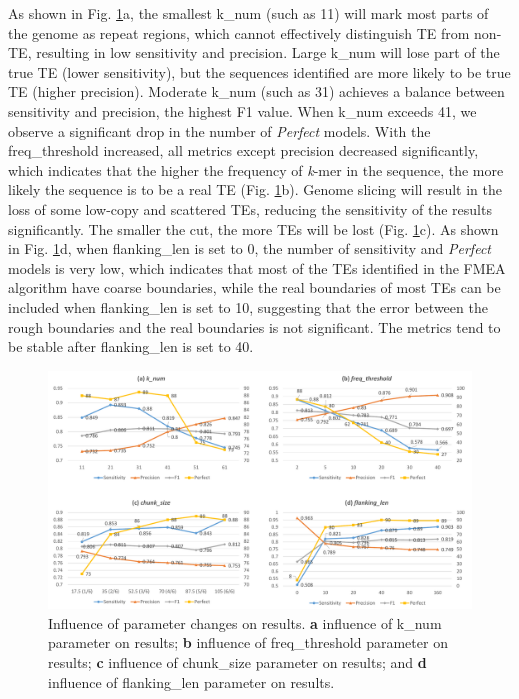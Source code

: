 \documentclass{bmcart}
\begin{document}
As shown in Fig. \ref{fig:param_results}a, the smallest k\_num (such as 11) will mark most parts of the genome as repeat regions, which cannot effectively distinguish TE from non-TE, resulting in low sensitivity and precision. Large k\_num will lose part of the true TE (lower sensitivity), but the sequences identified are more likely to be true TE (higher precision). Moderate k\_num (such as 31) achieves a balance between sensitivity and precision, the highest F1 value. When k\_num exceeds 41, we observe a significant drop in the number of \emph{Perfect} models. 
With the freq\_threshold increased, all metrics except precision decreased significantly, which indicates that the higher the frequency of \emph{k}-mer in the sequence, the more likely the sequence is to be a real TE (Fig. \ref{fig:param_results}b).
Genome slicing will result in the loss of some low-copy and scattered TEs, reducing the sensitivity of the results significantly. The smaller the cut, the more TEs will be lost (Fig. \ref{fig:param_results}c).
As shown in Fig. \ref{fig:param_results}d, when flanking\_len is set to 0, the number of sensitivity and \emph{Perfect} models is very low, which indicates that most of the TEs identified in the FMEA algorithm have coarse boundaries, while the real boundaries of most TEs can be included when flanking\_len is set to 10, suggesting that the error between the rough boundaries and the real boundaries is not significant. The metrics tend to be stable after flanking\_len is set to 40.


\begin{figure}[h!]
	\centerline{\includegraphics[width=1.0\textwidth]{figures/ParamResults.pdf}}
	\caption{Influence of parameter changes on results. \textbf{a} influence of k\_num parameter on results; \textbf{b} influence of freq\_threshold parameter on results; \textbf{c} influence of chunk\_size parameter on results; and \textbf{d} influence of flanking\_len parameter on results.}
	\label{fig:param_results}
\end{figure}
\end{document}
